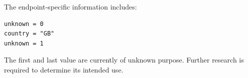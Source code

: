 The endpoint-specific information includes:

\begin{lstlisting}
unknown = 0
country = "GB"
unknown = 1
\end{lstlisting}

\begin{tcolorbox}[colback=yellow!10,colframe=orange!80!black,title=Warning]
The first and last value are currently of unknown purpose.
Further research is required to determine its intended use.
\end{tcolorbox}

\newpage